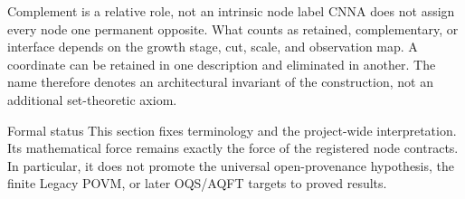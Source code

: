 \begin{cnnaInfoBox}{Complement is a relative role, not an intrinsic node label}
CNNA does not assign every node one permanent opposite.  What counts as retained, complementary, or interface depends on the growth stage, cut, scale, and observation map.  A coordinate can be retained in one description and eliminated in another.  The name therefore denotes an architectural invariant of the construction, not an additional set-theoretic axiom.
\end{cnnaInfoBox}

\begin{cnnaInfoBox}{Formal status}
This section fixes terminology and the project-wide interpretation.  Its mathematical force remains exactly the force of the registered node contracts.  In particular, it does not promote the universal open-provenance hypothesis, the finite Legacy POVM, or later OQS/AQFT targets to proved results.
\end{cnnaInfoBox}
